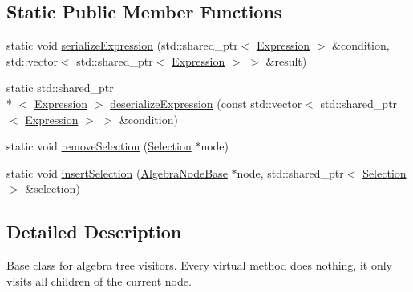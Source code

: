 \subsection*{Static Public Member Functions}
\begin{DoxyCompactItemize}
\item 
static void \hyperlink{classrafe_1_1_algebra_visitor_a9d363c344928367680e60d1f7606ad06}{serialize\+Expression} (std\+::shared\+\_\+ptr$<$ \hyperlink{classrafe_1_1_expression}{Expression} $>$ \&condition, std\+::vector$<$ std\+::shared\+\_\+ptr$<$ \hyperlink{classrafe_1_1_expression}{Expression} $>$ $>$ \&result)
\item 
static std\+::shared\+\_\+ptr\\*
$<$ \hyperlink{classrafe_1_1_expression}{Expression} $>$ \hyperlink{classrafe_1_1_algebra_visitor_aee992f1216f75570dc7073f5031ecf7f}{deserialize\+Expression} (const std\+::vector$<$ std\+::shared\+\_\+ptr$<$ \hyperlink{classrafe_1_1_expression}{Expression} $>$ $>$ \&condition)
\item 
static void \hyperlink{classrafe_1_1_algebra_visitor_a1de5a4866096b3da07f921d351f437e7}{remove\+Selection} (\hyperlink{classrafe_1_1_selection}{Selection} $\ast$node)
\item 
static void \hyperlink{classrafe_1_1_algebra_visitor_a4eb384d25bff8d19c3d0d7310d33bf81}{insert\+Selection} (\hyperlink{classrafe_1_1_algebra_node_base}{Algebra\+Node\+Base} $\ast$node, std\+::shared\+\_\+ptr$<$ \hyperlink{classrafe_1_1_selection}{Selection} $>$ \&selection)
\end{DoxyCompactItemize}


\subsection{Detailed Description}
Base class for algebra tree visitors. Every virtual method does nothing, it only visits all children of the current node. 

